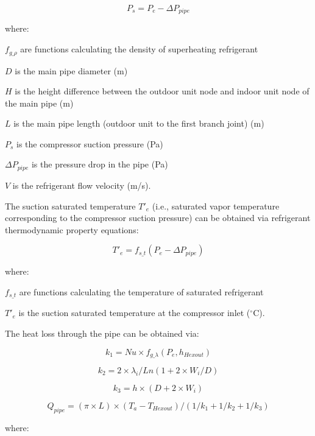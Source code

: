 \begin{equation}
  P_s=P_e-\Delta{P_{pipe}}
\end{equation}

where:

$f_{g\_\rho}$ are functions calculating the density of superheating refrigerant

$D$ is the main pipe diameter (m) 

$H$ is the height difference between the outdoor unit node and indoor unit node of the main pipe (m)

$L$ is the main pipe length (outdoor unit to the first branch joint) (m) 

$P_s$ is the compressor suction pressure (Pa) 

$\Delta{P_{pipe}}$ is the pressure drop in the pipe (Pa)

$V$ is the refrigerant flow velocity (m/s).

The suction saturated temperature $T'_e$ (i.e., saturated vapor temperature corresponding to the compressor suction pressure) can be obtained via refrigerant thermodynamic property equations:

\begin{equation}
  T'_e=f_{s\_t}(P_e-\Delta{P_{pipe}})
\end{equation}

where:

$f_{s\_t}$ are functions calculating the temperature of saturated refrigerant

$T'_e$ is the suction saturated temperature at the compressor inlet (\(^{\circ}\)C).

The heat loss through the pipe can be obtained via:

\begin{equation}
k_1=Nu\times{f_{g\_\lambda}(P_e,h_{Hexout})}
\end{equation}

\begin{equation}k_2=2\times{\lambda_i}/Ln(1+2\times{W_i}/D)\end{equation}

\begin{equation}k_3=h\times(D+2\times{W_i})\end{equation}

\begin{equation}Q_{pipe}=(\pi\times{L})\times(T_a-T_{Hexout})/(1/k_1+1/k_2+1/k_3)\end{equation}

where:

